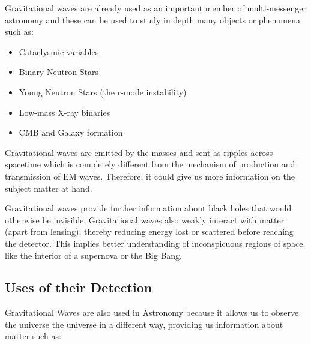 \hspace{1cm}Gravitational waves are already used as an important member of multi-messenger astronomy and these can be used to study in depth many objects or phenomena such as:

\begin{itemize}

\item Cataclysmic variables
\item Binary Neutron Stars
\item Young Neutron Stars (the r-mode instability)
\item Low-mass X-ray binaries
\item CMB and Galaxy formation

\end{itemize}

\hspace{1cm}Gravitational waves are emitted by the masses and sent as ripples across spacetime which is completely different from the mechanism of production and transmission of EM waves. Therefore, it could give us more information on the subject matter at hand.

\hspace{1cm}Gravitational waves provide further information about black holes that would otherwise be invisible. Gravitational waves also weakly interact with matter (apart from lensing), thereby reducing energy lost or scattered before reaching the detector. This implies better understanding of inconspicuous regions of space, like the interior of a supernova or the Big Bang.

\subsection*{Uses of their Detection}

\hspace{1cm} Gravitational Waves are also used in Astronomy because it allows us to observe the universe the universe in a different way, providing us information about matter such as:\\

